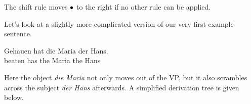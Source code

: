 The shift rule moves $\psep$ to the right if no other rule can be applied.
%
\begin{prooftree}
\end{prooftree}

\begin{examplebox}
    Let's look at a slightly more complicated version of our very first example sentence.
    \begin{exe}
        \ex
            {\gll Gehauen hat die Maria der Hans.\\
                  beaten has the Maria the Hans\\
            }
    \end{exe}
    Here the object \emph{die Maria} not only moves out of the VP, but it also scrambles across the subject \emph{der Hans} afterwards.
    A simplified derivation tree is given below.
    \begin{center}
\end{center}
\end{examplebox}
